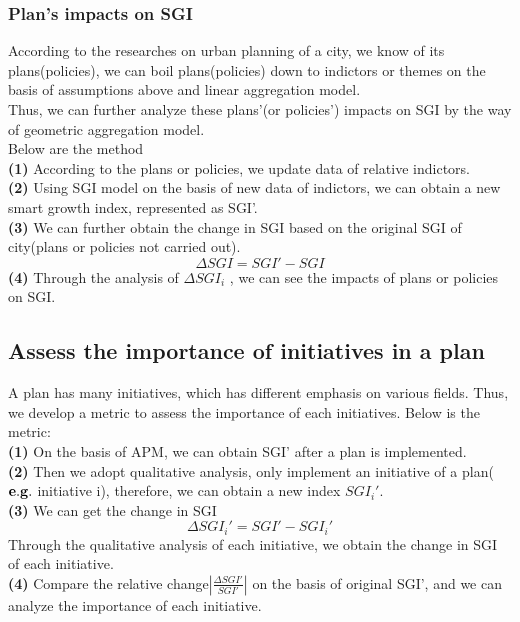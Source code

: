 \documentclass{mcmthesis}
\begin{document}
\subsubsection{Plan's impacts  on SGI}%
According to the researches on urban planning of a city, we know of its plans(policies), we can boil plans(policies) down to indictors or themes on the basis of assumptions above and linear aggregation model. \\
Thus, we can further analyze these plans'(or policies') impacts on SGI by the way of geometric aggregation model.\\
Below are the method\\
{\bf (1) } According to the plans or policies, we update data of relative indictors.\\
{\bf (2) } Using SGI model on the basis of new data of indictors, we can obtain a new smart growth index, represented as SGI'.\\
{\bf (3) } We can further obtain the change in SGI based on the original SGI of city(plans or policies not carried out). \\
$$\Delta SGI=SGI'-SGI$$
{\bf (4) } Through the analysis of ${\Delta SGI}_i$ , we can see the impacts of plans or policies on SGI.
\subsection{Assess the importance of initiatives in a plan}%
A plan has many initiatives, which has different emphasis on various fields. Thus, we develop a metric to assess the importance of each initiatives. Below is the metric:\\
{\bf (1) } On the basis of APM, we can obtain SGI' after a plan is implemented.\\
{\bf (2) }  Then we adopt qualitative analysis, only implement an initiative of a plan($\bf e.g.$ initiative i), therefore, we can obtain a new index ${SGI_i}'$.\\
{\bf (3) } We can get the change in SGI\\
$$\Delta {SGI_i}'={SGI'}-{SGI_i}'$$
Through the qualitative analysis of each initiative, we obtain the change in SGI of each initiative.\\
{\bf (4) } Compare the relative change$|\frac{\Delta SGI'}{SGI'}|$ on the basis of original SGI', and we can analyze the importance of each initiative. \\

\newpage
\end{document}
